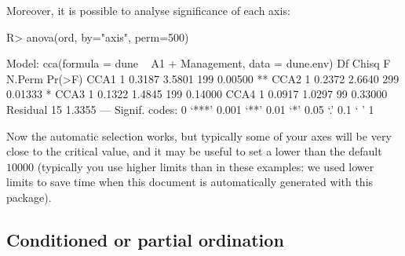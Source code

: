 \documentclass[article,nojss]{jss}
\begin{document}
Moreover, it is possible to analyse significance of each axis:
\begin{Schunk}
\begin{Sinput}
R> anova(ord, by="axis", perm=500)
\end{Sinput}
\begin{Soutput}
Model: cca(formula = dune ~ A1 + Management, data = dune.env)
         Df  Chisq      F N.Perm  Pr(>F)   
CCA1      1 0.3187 3.5801    199 0.00500 **
CCA2      1 0.2372 2.6640    299 0.01333 * 
CCA3      1 0.1322 1.4845    199 0.14000   
CCA4      1 0.0917 1.0297     99 0.33000   
Residual 15 1.3355                         
---
Signif. codes:  0 ‘***’ 0.001 ‘**’ 0.01 ‘*’ 0.05 ‘.’ 0.1 ‘ ’ 1
\end{Soutput}
\end{Schunk}
Now the automatic selection works, but typically some of your axes
will be very close to the critical value, and it may be useful to set
a lower  than the default $10000$ (typically you use
higher limits than in these examples: we used lower limits to save
time when this document is automatically generated with this package).

\subsection{Conditioned or partial ordination}
\end{document}
